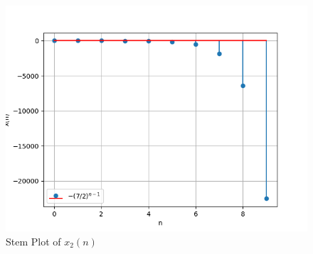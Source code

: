 \documentclass[journal,12pt,twocolumn]{IEEEtran}
\theoremstyle{remark}
\begin{document}
\begin{figure}[h]
    \centering
    \includegraphics[width=1.1\linewidth]{ncert-maths/11/9/3/6/figs/graph2.png}
    \caption{Stem Plot of $x_2(n)$}
    \label{stemplot2}
\end{figure}
\end{document}

